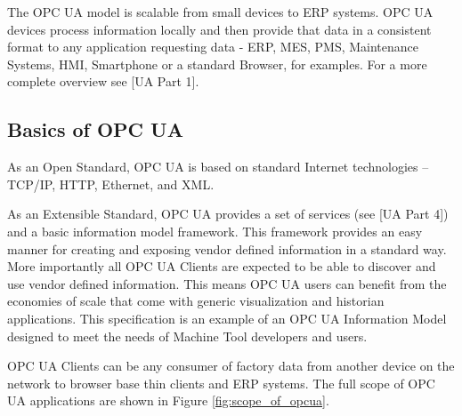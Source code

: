 \documentclass{mtconnect}	%
\begin{document}
The OPC UA model is scalable from small devices to ERP systems. OPC UA devices process information locally and then provide that data in a consistent format to any application requesting data - ERP, MES, PMS, Maintenance Systems, HMI, Smartphone or a standard Browser, for examples. For a more complete overview see [UA Part 1].

\subsection{Basics of OPC UA}

As an Open Standard, OPC UA is based on standard Internet technologies – TCP/IP, HTTP, Ethernet, and XML.

As an Extensible Standard, OPC UA provides a set of services (see [UA Part 4]) and a basic information model framework. This framework provides an easy manner for creating and exposing vendor defined information in a standard way. More importantly all OPC UA Clients are expected to be able to discover and use vendor defined information. This means OPC UA users can benefit from the economies of scale that come with generic visualization and historian applications. This specification is an example of an OPC UA Information Model designed to meet the needs of Machine Tool developers and users.

OPC UA Clients can be any consumer of factory data from another device on the network to browser base thin clients and ERP systems. The full scope of OPC UA applications are shown in Figure \ref{fig:scope_of_opcua}.
\end{document}
